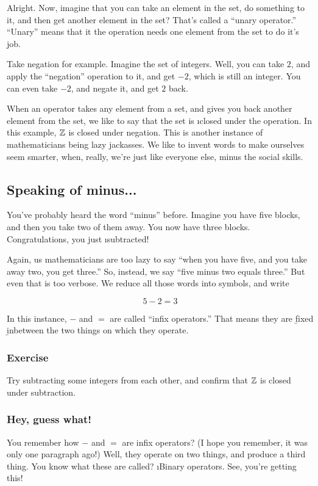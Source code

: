 Alright. Now, imagine that you can take an element in the set, do something to
it, and then get another element in the set? That's called a ``unary operator.''
``Unary'' means that it the operation needs one element from the set to do it's
job.

Take negation for example. Imagine the set of integers. Well, you can take $2$,
and apply the ``negation'' operation to it, and get $-2$, which is still an
integer. You can even take $-2$, and negate it, and get $2$ back.

When an operator takes any element from a set, and gives you back another
element from the set, we like to say that the set is \i{closed} under the
operation. In this example, $\mathbb{Z}$ is closed under negation. This is another
instance of mathematicians being lazy jackasses. We like to invent words to make
ourselves seem smarter, when, really, we're just like everyone else, minus the
social skills.

\subsection{Speaking of minus...}

You've probably heard the word ``minus'' before. Imagine you have five blocks,
and then you take two of them away. You now have three blocks. Congratulations,
you just \i{subtracted}! 

Again, us mathematicians are too lazy to say ``when you have five, and you take
away two, you get three.'' So, instead, we say ``five minus two equals three.''
But even that is too verbose. We reduce all those words into symbols, and write

\[ 5 - 2 = 3 \]

In this instance, $-$ and $=$ are called ``infix operators.'' That means they
are \b{fix}ed \b{in}between the two things on which they operate.

\subsubsection{Exercise}

Try subtracting some integers from each other, and confirm that $\mathbb{Z}$ is closed
under subtraction.

\subsubsection{Hey, guess what!}

You remember how $-$ and $=$ are infix operators? (I hope you remember, it was
only one paragraph ago!) Well, they operate on two things, and produce a third
thing. You know what these are called? \i{Binary operators}. See, you're getting
this!

